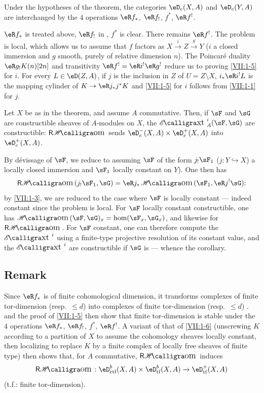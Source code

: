 \begin{corollary_}\label{VII:1-5}
Under the hypotheses of the theorem, the categories $\eD_c(X,A)$ and
$\eD_c(Y,A)$ are interchanged by the $4$ operations
$\eR f_\ast$, $\eR f_!$, $f^\ast$, $\eR f^!$.
\end{corollary_}

$\eR f_\ast$ is treated above, $\eR f_!$ in \cite[XVII 5.3]{sga4},
$f^\ast$ is clear. There remains $\eR f^!$. The problem is local, which allows us to
assume that $f$ factors as $X\xrightarrow i Z \xrightarrow g Y$ ($i$
a closed immersion and $g$ smooth, purely of relative dimension $n$). The
Poincar\'e duality $\eR g_! K(n)[2 n]$ and transitivity
$\eR f^! = \eR i^! \eR g^!$ reduce us to proving \ref{VII:1-5} for $i$.
For every $L\in \eD(Z,A)$, if $j$ is the inclusion in $Z$ of $U=Z\setminus X$,
$i_\ast \eR i^! L$ is the mapping cylinder of $K\to \eR j_\ast j^\ast K$ and
\ref{VII:1-5} for $i$ follows from \ref{VII:1-1} for $j$.




\begin{corollary_}\label{VII:1-6}
Let $X$ be as in the theorem, and assume $A$ commutative. Then, if
$\sF$ and $\sG$ are constructible sheaves of $A$-modules on $X$, the
$\Ext_A^i(\sF,\sG)$ are constructible: $\rHom$ sends
$\eD_c^-(X,A)\times \eD_c^+(X,A)$ into $\eD_c^+(X,A)$.
\end{corollary_}

By d\'evissage of $\sF$, we reduce to assuming $\sF$ of the form
$j_!\sF_1$ ($j:Y\hookrightarrow X$) a locally closed immersion and $\sF_1$
locally constant on $Y$). One then has
\[
  \rHom(j_! \sF_1,\sG) = \eR j_\ast \Hom(\sF_1,\eR j^! \sG) \text{:}
\]
by \ref{VII:1-3}, we are reduced to the case where $\sF$ is locally
constant --- indeed constant since the problem is local. For $\sF$
locally constant constructible, one has $\Hom(\sF,\sG)_x=\hom(\sF_x,\sG_x)$,
and likewise for $\rHom$. For $\sF$ constant, one can therefore compute the
$\Ext^i$ using a finite-type projective resolution of its constant
value, and the $\Ext^i$ are constructible if $\sG$ is --- whence the
corollary.




\subsection{Remark}\label{VII:1-7}

Since $\eR f_\ast$ is of finite cohomological dimension, it transforms
complexes of finite tor-dimension (resp.\ $\leqslant d$) into complexes of
finite tor-dimension (resp.\ $\leqslant d$) \cite[XVII 5.2.11]{sga4}.
\cite[XVII 5.2.10]{sga4} and the proof of \ref{VII:1-5} then show that
finite tor-dimension is stable under the $4$ operations $\eR f_\ast$,
$\eR f_!$, $f^\ast$, $\eR f^!$. A variant of that of \ref{VII:1-6}
(unscrewing $K$ according to a partition of $X$ to assume the cohomology
sheaves locally constant, then localizing to replace $K$ by a
finite complex of locally free sheaves of finite type) then shows that,
for $A$ commutative, $\rHom$ induces
\[
  \rHom:\eD_\text{ctf}^b(X,A)\times \eD_\text{tf}^b(X,A) \to \eD_\text{tf}^+(X,A)
\]
(t.f.: finite tor-dimension).




